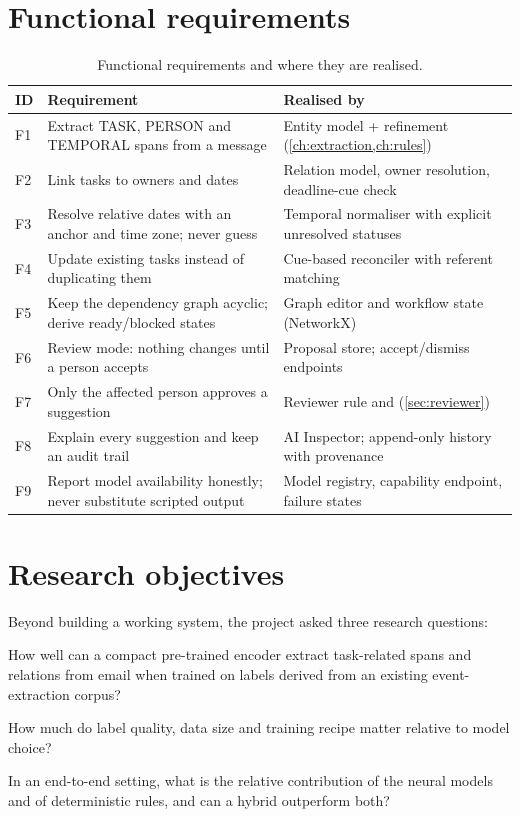 \section{Functional requirements}
\begin{table}[h]
\centering
\caption{Functional requirements and where they are realised.}
\label{tab:requirements}
\footnotesize
\begin{tabularx}{\linewidth}{@{}p{8mm}Lp{55mm}@{}}
\toprule
ID & Requirement & Realised by \\
\midrule
F1 & Extract TASK, PERSON and TEMPORAL spans from a message & Entity model + refinement (\cref{ch:extraction,ch:rules}) \\
F2 & Link tasks to owners and dates & Relation model, owner resolution, deadline-cue check \\
F3 & Resolve relative dates with an anchor and time zone; never guess & Temporal normaliser with explicit unresolved statuses \\
F4 & Update existing tasks instead of duplicating them & Cue-based reconciler with referent matching \\
F5 & Keep the dependency graph acyclic; derive ready/blocked states & Graph editor and workflow state (NetworkX) \\
F6 & Review mode: nothing changes until a person accepts & Proposal store; accept/dismiss endpoints \\
F7 & Only the affected person approves a suggestion & Reviewer rule and  (\cref{sec:reviewer}) \\
F8 & Explain every suggestion and keep an audit trail & AI Inspector; append-only history with provenance \\
F9 & Report model availability honestly; never substitute scripted output & Model registry, capability endpoint, failure states \\
\bottomrule
\end{tabularx}
\end{table}

\section{Research objectives}
Beyond building a working system, the project asked three research questions:
\begin{description}[style=nextline, leftmargin=1.6em, font=\normalfont\sffamily\bfseries\color{navy}]
  \item[RQ1] How well can a compact pre-trained encoder extract task-related spans and relations from email when trained on labels derived from an existing event-extraction corpus?
  \item[RQ2] How much do label quality, data size and training recipe matter relative to model choice?
  \item[RQ3] In an end-to-end setting, what is the relative contribution of the neural models and of deterministic rules, and can a hybrid outperform both?
\end{description}

